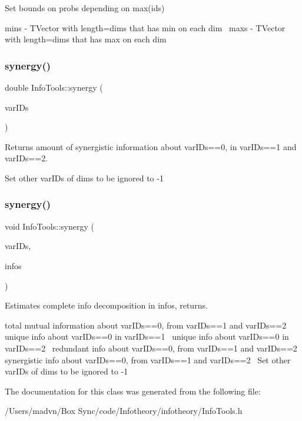 Set bounds on probs depending on max(ids) 

mins -\/ T\+Vector with length=dims that has min on each dim~\newline
maxs -\/ T\+Vector with length=dims that has max on each dim \mbox{\label{class_info_tools_a317eb990ee587b544e22e8c1877e8a93}} 
\subsubsection{\texorpdfstring{synergy()}{synergy()}\hspace{0.1cm}{\footnotesize\ttfamily [1/2]}}
{\footnotesize\ttfamily double Info\+Tools\+::synergy (\begin{DoxyParamCaption}\item[{T\+Vector$<$ int $>$ \&}]{var\+I\+Ds }\end{DoxyParamCaption})\hspace{0.3cm}{\ttfamily [inline]}}



Returns amount of synergistic information about var\+I\+Ds==0, in var\+I\+Ds==1 and var\+I\+Ds==2. 

Set other var\+I\+Ds of dims to be ignored to -\/1 \mbox{\label{class_info_tools_aaeb993950ecbede3f66614a1bf4af845}} 
\subsubsection{\texorpdfstring{synergy()}{synergy()}\hspace{0.1cm}{\footnotesize\ttfamily [2/2]}}
{\footnotesize\ttfamily void Info\+Tools\+::synergy (\begin{DoxyParamCaption}\item[{T\+Vector$<$ int $>$ \&}]{var\+I\+Ds,  }\item[{T\+Vector$<$ double $>$ \&}]{infos }\end{DoxyParamCaption})\hspace{0.3cm}{\ttfamily [inline]}}



Estimates complete info decomposition in infos, returns. 

total mutual information about var\+I\+Ds==0, from var\+I\+Ds==1 and var\+I\+Ds==2~\newline
 unique info about var\+I\+Ds==0 in var\+I\+Ds==1~\newline
 unique info about var\+I\+Ds==0 in var\+I\+Ds==2~\newline
 redundant info about var\+I\+Ds==0, from var\+I\+Ds==1 and var\+I\+Ds==2~\newline
 synergistic info about var\+I\+Ds==0, from var\+I\+Ds==1 and var\+I\+Ds==2~\newline
Set other var\+I\+Ds of dims to be ignored to -\/1 

The documentation for this class was generated from the following file\+:\begin{DoxyCompactItemize}
\item 
/\+Users/madvn/\+Box Sync/code/\+Infotheory/infotheory/Info\+Tools.\+h\end{DoxyCompactItemize}
